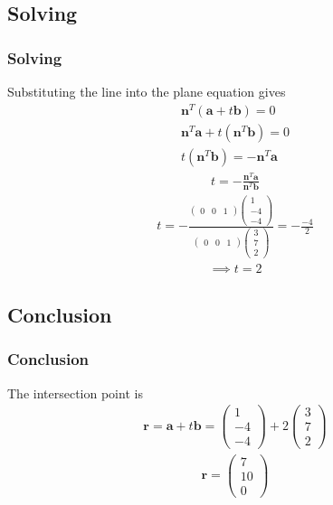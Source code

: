 \documentclass{beamer}
\providecommand{\brak}[1]{\ensuremath{\left(#1\right)}}
\theoremstyle{remark}
\newcommand{\myvec}[1]{\ensuremath{\begin{pmatrix}#1\end{pmatrix}}}
\let\vec\mathbf
\numberwithin{equation}{section}
\begin{document}
\subsection{Solving}
\begin{frame}
\frametitle{Solving}
 Substituting the line into the plane equation gives  
\begin{align}
\vec{n}^T\brak{ \vec{a} + t\vec{b}} = 0  \\
\vec{n}^T \vec{a} + t\brak{\vec{n}^T \vec{b}} = 0 \\
t\brak{\vec{n}^T \vec{b}}=-\vec{n}^T \vec{a} 
\end{align}
\begin{align}
t =-\frac{\vec{n}^T \vec{a}}{\vec{n}^T \vec{b}}
\end{align}
\begin{align}
t =-\frac{\myvec{0 & 0 & 1}\myvec{1 \\ -4 \\ -4}}{\myvec{0 & 0 & 1}\myvec{3 \\ 7 \\ 2}}  = -\frac{-4}{2} 
\end{align}
\begin{align}
\implies t=2
\end{align}
\end{frame}
\subsection{Conclusion}
\begin{frame}
\frametitle{Conclusion}
The intersection point is  
\begin{align}
\vec{r} = \vec{a} + t\vec{b} 
= \myvec{1 \\ -4 \\ -4} + 2\myvec{3 \\ 7 \\ 2}
\end{align} 
\begin{align}
\vec{r} = \myvec{7 \\ 10 \\ 0}
\end{align}
\end{frame}
\end{document}

